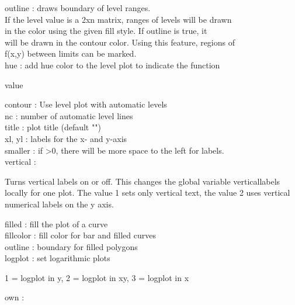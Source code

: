 \documentclass{article}
\begin{document}
\begin{eulernotebook}
\begin{eulercomment}
\begin{eulercomment}
\begin{eulercomment}
\begin{eulercomment}
\begin{eulercomment}
\begin{eulercomment}
\begin{eulercomment}
\begin{eulercomment}
\begin{eulercomment}
outline   : draws boundary of level ranges.
\\
If the level value is a 2xn matrix, ranges of levels will be drawn\\
in the color using the given fill style. If outline is true, it\\
will be drawn in the contour color. Using this feature, regions of\\
f(x,y) between limits can be marked.
\\
hue       : add hue color to the level plot to indicate the function\\
\end{eulercomment}
\begin{eulerttcomment}
            value
\end{eulerttcomment}
\begin{eulercomment}
contour   : Use level plot with automatic levels\\
nc        : number of automatic level lines\\
title     : plot title (default "")\\
xl, yl    : labels for the x- and y-axis\\
smaller   : if \textgreater{}0, there will be more space to the left for labels.\\
vertical  :\\
\end{eulercomment}
\begin{eulerttcomment}
  Turns vertical labels on or off. This changes the global variable
  verticallabels locally for one plot. The value 1 sets only vertical
  text, the value 2 uses vertical numerical labels on the y axis.
\end{eulerttcomment}
\begin{eulercomment}
filled    : fill the plot of a curve\\
fillcolor : fill color for bar and filled curves\\
outline   : boundary for filled polygons\\
logplot   : set logarithmic plots\\
\end{eulercomment}
\begin{eulerttcomment}
            1 = logplot in y,
            2 = logplot in xy,
            3 = logplot in x
\end{eulerttcomment}
\begin{eulercomment}
own       :\\
\end{eulercomment}

\end{eulercomment}
\end{eulercomment}
\end{eulercomment}
\end{eulercomment}
\end{eulercomment}
\end{eulercomment}
\end{eulercomment}
\end{eulercomment}
\end{eulernotebook}
\end{document}
